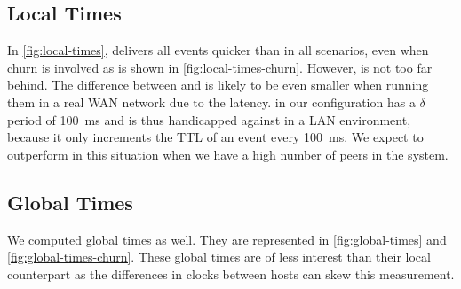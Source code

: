 \subsection{Local Times}
\label{sub:local-times}
% 	

% 	
In \autoref{fig:local-times}, \jgroups delivers all events quicker than \epto in all scenarios, even when churn is involved as is shown in \autoref{fig:local-times-churn}. However, \epto is not too far behind. The difference between \epto and \jgroups is likely to be even smaller when running them in a real WAN network due to the latency. \epto in our configuration has a $\delta$ period of \SI{100}{\milli\second} and is thus handicapped against \jgroups in a LAN environment, because it only increments the TTL of an event every \SI{100}{\milli\second}. We expect \epto to outperform \jgroups in this situation when we have a high number of peers in the system.
\subsection{Global Times}
% 	

% 	
We computed global times as well. They are represented in \autoref{fig:global-times} and \autoref{fig:global-times-churn}. These global times are of less interest than their local counterpart as the differences in clocks between hosts can skew this measurement.

